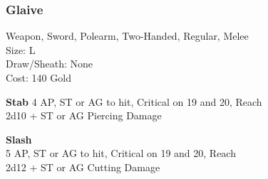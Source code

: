 \subsubsection{Glaive}\label{weapon:glaive}
Weapon, Sword, Polearm, Two-Handed, Regular, Melee\\
Size: L\\
Draw/Sheath: None\\
Cost: 140 Gold

\textbf{Stab}
4 AP, ST or AG to hit, Critical on 19 and 20,  Reach\\
2d10 + \texttimes ST or AG Piercing Damage

\textbf{Slash}\\
5 AP, ST or AG to hit, Critical on 19 and 20,  Reach\\
2d12 + \texttimes ST or AG Cutting Damage

